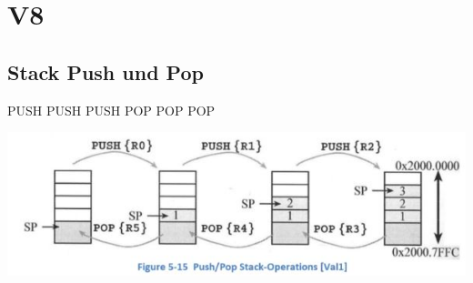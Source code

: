 \section{V8}
\subsection{Stack Push und Pop}
\begin{multicols}{2}
    \begin{minipage}{3cm}
        PUSH \newline
        PUSH \newline
        PUSH \newline
        POP  \newline
        POP  \newline
        POP  \newline
    \end{minipage}
    \begin{minipage}{\linewidth}
        \includegraphics[width=1.5\linewidth]{images/stackpushpop}  
    \end{minipage}
\end{multicols}

